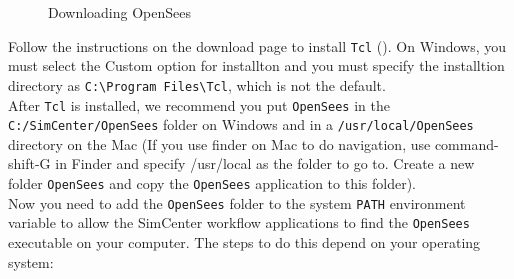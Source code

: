 \begin{figure}[!htbp]
  \caption{Downloading OpenSees}
  \label{fig:openseesDownload}
\end{figure}

Follow the instructions on the download page to install \texttt{Tcl}
(). On Windows, you must select the Custom option for installton and you must specify
the installtion directory as \texttt{C:\textbackslash Program Files\textbackslash Tcl}, 
which is not the default. \\

After \texttt{Tcl} is installed, we recommend you put \texttt{OpenSees} in
the \texttt{C:/SimCenter/OpenSees} folder on Windows and in
a \texttt{/usr/local/OpenSees} directory on the Mac (If you use finder
on Mac to do navigation, use command-shift-G in Finder and specify
/usr/local as the folder to go to. Create a new folder \texttt{OpenSees}
and copy the \texttt{OpenSees} application to this folder).\\


Now you need to add the \texttt{OpenSees} folder to the
system \texttt{PATH} environment variable to allow the SimCenter
workflow applications to find the \texttt{OpenSees} executable on your
computer. The steps to do this depend on your operating system:

